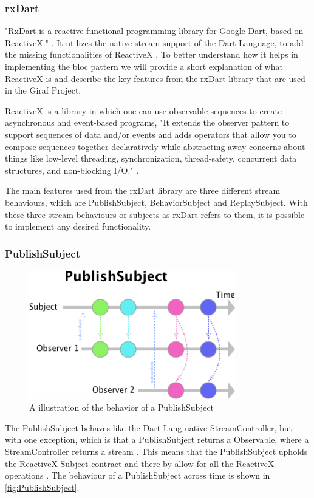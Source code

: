 \subsubsection{rxDart}
"RxDart is a reactive functional programming library for Google Dart, based on ReactiveX." \cite{rxDart}. It utilizes the native stream support of the Dart Language, to add the missing functionalities of ReactiveX \cite{rxDart}. To better understand how it helps in implementing the \gls{bloc} pattern we will provide a short explanation of what ReactiveX is and describe the key features from the rxDart library that are used in the Giraf Project.

ReactiveX is a library in which one can use observable sequences to create asynchronous and event-based programs, "It extends the observer pattern to support sequences of data and/or events and adds operators that allow you to compose sequences together declaratively while abstracting away concerns about things like low-level threading, synchronization, thread-safety, concurrent data structures, and non-blocking I/O." \cite{ReactiveXWebsite}.

The main features used from the rxDart library are three different stream behaviours, which are PublishSubject, BehaviorSubject and ReplaySubject. With these three stream behaviours or subjects as rxDart refers to them, it is possible to implement any desired functionality.

\subsubsection*{PublishSubject}
\begin{figure}[h]
    \centering
    \includegraphics[width=0.8\textwidth]{figures/PublishSubject.png}
    \caption{A illustration of the behavior of a PublishSubject}
    \label{fig:PublishSubject}
\end{figure}
The PublishSubject behaves like the Dart Lang native StreamController, but with one exception, which is that a PublishSubject returns a Observable, where a StreamController returns a stream \cite{PublishSubject}. This means that the PublishSubject upholds the ReactiveX Subject contract and there by allow for all the ReactiveX operations \cite{PublishSubject}. The behaviour of a PublishSubject across time is shown in \autoref{fig:PublishSubject}.

